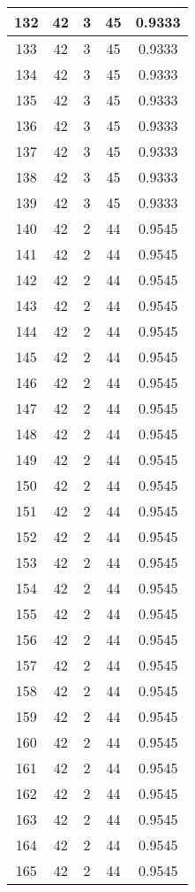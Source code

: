 \documentclass[letterpaper, 12pt]{article}
\begin{document}
\begin{longtable}{|c|c|c|c|c|}
\hline
132 & 42 & 3 & 45 & 0.9333 \\
\hline
133 & 42 & 3 & 45 & 0.9333 \\
\hline
134 & 42 & 3 & 45 & 0.9333 \\
\hline
135 & 42 & 3 & 45 & 0.9333 \\
\hline
136 & 42 & 3 & 45 & 0.9333 \\
\hline
137 & 42 & 3 & 45 & 0.9333 \\
\hline
138 & 42 & 3 & 45 & 0.9333 \\
\hline
139 & 42 & 3 & 45 & 0.9333 \\
\hline
140 & 42 & 2 & 44 & 0.9545 \\
\hline
141 & 42 & 2 & 44 & 0.9545 \\
\hline
142 & 42 & 2 & 44 & 0.9545 \\
\hline
143 & 42 & 2 & 44 & 0.9545 \\
\hline
144 & 42 & 2 & 44 & 0.9545 \\
\hline
145 & 42 & 2 & 44 & 0.9545 \\
\hline
146 & 42 & 2 & 44 & 0.9545 \\
\hline
147 & 42 & 2 & 44 & 0.9545 \\
\hline
148 & 42 & 2 & 44 & 0.9545 \\
\hline
149 & 42 & 2 & 44 & 0.9545 \\
\hline
150 & 42 & 2 & 44 & 0.9545 \\
\hline
151 & 42 & 2 & 44 & 0.9545 \\
\hline
152 & 42 & 2 & 44 & 0.9545 \\
\hline
153 & 42 & 2 & 44 & 0.9545 \\
\hline
154 & 42 & 2 & 44 & 0.9545 \\
\hline
155 & 42 & 2 & 44 & 0.9545 \\
\hline
156 & 42 & 2 & 44 & 0.9545 \\
\hline
157 & 42 & 2 & 44 & 0.9545 \\
\hline
158 & 42 & 2 & 44 & 0.9545 \\
\hline
159 & 42 & 2 & 44 & 0.9545 \\
\hline
160 & 42 & 2 & 44 & 0.9545 \\
\hline
161 & 42 & 2 & 44 & 0.9545 \\
\hline
162 & 42 & 2 & 44 & 0.9545 \\
\hline
163 & 42 & 2 & 44 & 0.9545 \\
\hline
164 & 42 & 2 & 44 & 0.9545 \\
\hline
165 & 42 & 2 & 44 & 0.9545 \\

\end{longtable}
\end{document}
